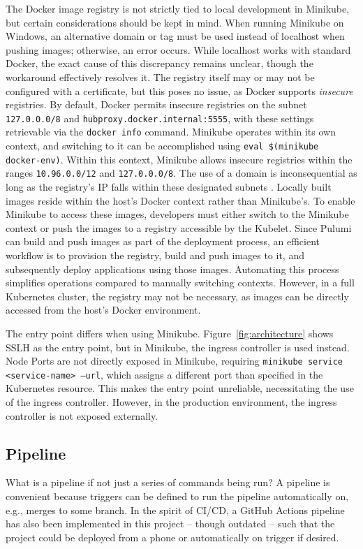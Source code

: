 The Docker image registry is not strictly tied to local development in Minikube, but certain considerations should be kept in mind. When running Minikube on Windows, an alternative domain or tag must be used instead of localhost when pushing images; otherwise, an error occurs. While localhost works with standard Docker, the exact cause of this discrepancy remains unclear, though the workaround effectively resolves it. The registry itself may or may not be configured with a certificate, but this poses no issue, as Docker supports \textit{insecure} registries. By default, Docker permits insecure registries on the subnet \texttt{127.0.0.0/8} and \texttt{hubproxy.docker.internal:5555}, with these settings retrievable via the \texttt{docker info} command. Minikube operates within its own context, and switching to it can be accomplished using \texttt{eval \$(minikube docker-env)}. Within this context, Minikube allows insecure registries within the ranges \texttt{10.96.0.0/12} and \texttt{127.0.0.0/8}. The use of a domain is inconsequential as long as the registry's IP falls within these designated subnets \cite{dockerInsecureRegistries}. Locally built images reside within the host's Docker context rather than Minikube's. To enable Minikube to access these images, developers must either switch to the Minikube context or push the images to a registry accessible by the Kubelet. Since Pulumi can build and push images as part of the deployment process, an efficient workflow is to provision the registry, build and push images to it, and subsequently deploy applications using those images. Automating this process simplifies operations compared to manually switching contexts. However, in a full Kubernetes cluster, the registry may not be necessary, as images can be directly accessed from the host's Docker environment.

The entry point differs when using Minikube. Figure~\ref{fig:architecture} shows SSLH as the entry point, but in Minikube, the ingress controller is used instead. Node Ports are not directly exposed in Minikube, requiring \texttt{minikube service <service-name> --url}, which assigns a different port than specified in the Kubernetes resource. This makes the entry point unreliable, necessitating the use of the ingress controller. However, in the production environment, the ingress controller is not exposed externally.

\subsection{Pipeline}
What is a pipeline if not just a series of commands being run? A pipeline is convenient because triggers can be defined to run the pipeline automatically on, e.g., merges to some branch. In the spirit of CI/CD, a GitHub Actions pipeline has also been implemented in this project -- though outdated -- such that the project could be deployed from a phone or automatically on trigger if desired.

